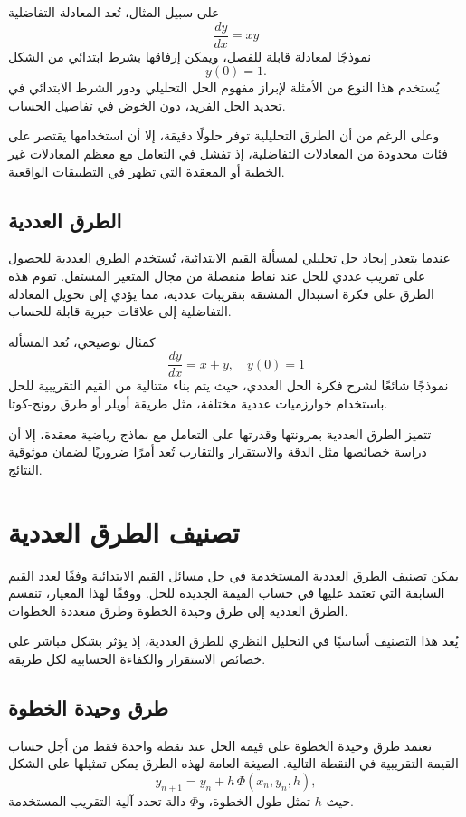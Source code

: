 على سبيل المثال، تُعد المعادلة التفاضلية
\[
\frac{dy}{dx} = xy
\]
نموذجًا لمعادلة قابلة للفصل، ويمكن إرفاقها بشرط ابتدائي من الشكل
\[
y(0) = 1.
\]
يُستخدم هذا النوع من الأمثلة لإبراز مفهوم الحل التحليلي ودور الشرط الابتدائي في تحديد الحل الفريد، دون الخوض في تفاصيل الحساب.

وعلى الرغم من أن الطرق التحليلية توفر حلولًا دقيقة، إلا أن استخدامها يقتصر على فئات محدودة من المعادلات التفاضلية، إذ تفشل في التعامل مع معظم المعادلات غير الخطية أو المعقدة التي تظهر في التطبيقات الواقعية.

\subsection{الطرق العددية}
عندما يتعذر إيجاد حل تحليلي لمسألة القيم الابتدائية، تُستخدم الطرق العددية للحصول على تقريب عددي للحل عند نقاط منفصلة من مجال المتغير المستقل. تقوم هذه الطرق على فكرة استبدال المشتقة بتقريبات عددية، مما يؤدي إلى تحويل المعادلة التفاضلية إلى علاقات جبرية قابلة للحساب.

كمثال توضيحي، تُعد المسألة
\[
\frac{dy}{dx} = x + y, \quad y(0) = 1
\]
نموذجًا شائعًا لشرح فكرة الحل العددي، حيث يتم بناء متتالية من القيم التقريبية للحل باستخدام خوارزميات عددية مختلفة، مثل طريقة أويلر أو طرق رونج-كوتا.

تتميز الطرق العددية بمرونتها وقدرتها على التعامل مع نماذج رياضية معقدة، إلا أن دراسة خصائصها مثل الدقة والاستقرار والتقارب تُعد أمرًا ضروريًا لضمان موثوقية النتائج.

\section{تصنيف الطرق العددية}
يمكن تصنيف الطرق العددية المستخدمة في حل مسائل القيم الابتدائية وفقًا لعدد القيم السابقة التي تعتمد عليها في حساب القيمة الجديدة للحل. ووفقًا لهذا المعيار، تنقسم الطرق العددية إلى طرق وحيدة الخطوة وطرق متعددة الخطوات.

يُعد هذا التصنيف أساسيًا في التحليل النظري للطرق العددية، إذ يؤثر بشكل مباشر على خصائص الاستقرار والكفاءة الحسابية لكل طريقة.

\subsection{طرق وحيدة الخطوة}
تعتمد طرق وحيدة الخطوة على قيمة الحل عند نقطة واحدة فقط من أجل حساب القيمة التقريبية في النقطة التالية. الصيغة العامة لهذه الطرق يمكن تمثيلها على الشكل
\[
y_{n+1} = y_n + h\,\Phi(x_n,y_n,h),
\]
حيث \(h\) تمثل طول الخطوة، و\(\Phi\) دالة تحدد آلية التقريب المستخدمة.

